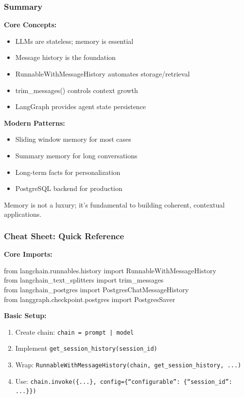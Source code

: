 \documentclass[aspectratio=169,11pt]{beamer}
\begin{document}
\begin{frame}
  \frametitle{Summary}
  \textbf{Core Concepts:}
  \begin{itemize}
    \item LLMs are stateless; memory is essential
    \item Message history is the foundation
    \item RunnableWithMessageHistory automates storage/retrieval
    \item trim\_messages() controls context growth
    \item LangGraph provides agent state persistence
  \end{itemize}
  \vspace{0.6em}
  \textbf{Modern Patterns:}
  \begin{itemize}
    \item Sliding window memory for most cases
    \item Summary memory for long conversations
    \item Long-term facts for personalization
    \item PostgreSQL backend for production
  \end{itemize}
  \vspace{0.6em}
  \begin{conceptbox}[Remember]
    Memory is not a luxury; it's fundamental to building coherent, contextual applications.
  \end{conceptbox}
\end{frame}

\begin{frame}
  \frametitle{Cheat Sheet: Quick Reference}
  \textbf{Core Imports:}
  \begin{codebox}[Imports]
    \ttfamily\small
    from langchain.runnables.history import RunnableWithMessageHistory \\
    from langchain\_text\_splitters import trim\_messages \\
    from langchain\_postgres import PostgresChatMessageHistory \\
    from langgraph.checkpoint.postgres import PostgresSaver
  \end{codebox}
  \vspace{0.6em}
  \textbf{Basic Setup:}
  \begin{enumerate}
    \item Create chain: \texttt{chain = prompt | model}
    \item Implement \texttt{get\_session\_history(session\_id)}
    \item Wrap: \texttt{RunnableWithMessageHistory(chain, get\_session\_history, ...)}
    \item Use: \texttt{chain.invoke(\{...\}, config=\{``configurable'': \{``session\_id'': ...\}\})}
  \end{enumerate}
\end{frame}
\end{document}
